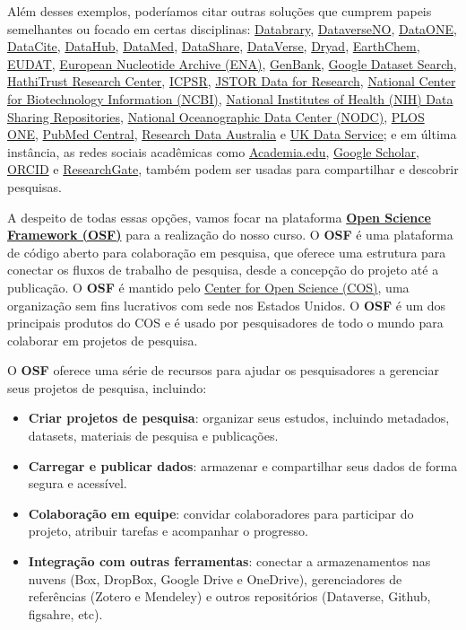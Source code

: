 \documentclass[
  a4paper,
]{article}
\providecommand{\tightlist}{%
  \setlength{\itemsep}{0pt}\setlength{\parskip}{0pt}}\usepackage{longtable,booktabs,array}
\begin{document}
Além desses exemplos, poderíamos citar outras soluções que cumprem
papeis semelhantes ou focado em certas disciplinas:
\href{databrary.org}{Databrary}, \href{dataverse.no}{DataverseNO},
\href{dataone.org}{DataONE}, \href{datacite.org}{DataCite},
\href{datahub.io}{DataHub}, \href{datamed.org}{DataMed},
\href{datashare.is.ed.ac.uk}{DataShare},
\href{dataverse.org}{DataVerse}, \href{datadryad.org}{Dryad},
\href{earthchem.org}{EarthChem}, \href{eudat.eu}{EUDAT},
\href{www.ebi.ac.uk/ena/browser/home}{European Nucleotide Archive
(ENA)}, \href{ncbi.nlm.nih.gov/genbank}{GenBank},
\href{datasetsearch.research.google.com}{Google Dataset Search},
\href{hathitrust.org}{HathiTrust Research Center},
\href{icpsr.umich.edu}{ICPSR}, \href{jstor.org}{JSTOR Data for
Research}, \href{ncbi.nlm.nih.gov}{National Center for Biotechnology
Information (NCBI)}, \href{nih.gov}{National Institutes of Health (NIH)
Data Sharing Repositories}, \href{data.noaa.gov}{National Oceanographic
Data Center (NODC)}, \href{plos.org}{PLOS ONE},
\href{ncbi.nlm.nih.gov/pmc}{PubMed Central},
\href{researchdata.ands.org.au}{Research Data Australia} e
\href{ukdataservice.ac.uk}{UK Data Service}; e em última instância, as
redes sociais acadêmicas como \href{academia.edu}{Academia.edu},
\href{scholar.google.com}{Google Scholar}, \href{orcid.org}{ORCID} e
\href{researchgate.net}{ResearchGate}, também podem ser usadas para
compartilhar e descobrir pesquisas.

A despeito de todas essas opções, vamos focar na plataforma
\href{https://osf.io/}{\textbf{Open Science Framework (OSF)}} para a
realização do nosso curso. O \textbf{OSF} é uma plataforma de código
aberto para colaboração em pesquisa, que oferece uma estrutura para
conectar os fluxos de trabalho de pesquisa, desde a concepção do projeto
até a publicação. O \textbf{OSF} é mantido pelo
\href{https://www.cos.io/}{Center for Open Science (COS)}, uma
organização sem fins lucrativos com sede nos Estados Unidos. O
\textbf{OSF} é um dos principais produtos do COS e é usado por
pesquisadores de todo o mundo para colaborar em projetos de pesquisa.

O \textbf{OSF} oferece uma série de recursos para ajudar os
pesquisadores a gerenciar seus projetos de pesquisa, incluindo:

\begin{itemize}
\tightlist
\item
  \textbf{Criar projetos de pesquisa}: organizar seus estudos, incluindo
  metadados, datasets, materiais de pesquisa e publicações.
\item
  \textbf{Carregar e publicar dados}: armazenar e compartilhar seus
  dados de forma segura e acessível.
\item
  \textbf{Colaboração em equipe}: convidar colaboradores para participar
  do projeto, atribuir tarefas e acompanhar o progresso.
\item
  \textbf{Integração com outras ferramentas}: conectar a armazenamentos
  nas nuvens (Box, DropBox, Google Drive e OneDrive), gerenciadores de
  referências (Zotero e Mendeley) e outros repositórios (Dataverse,
  Github, figsahre, etc).
\end{itemize}
\end{document}
